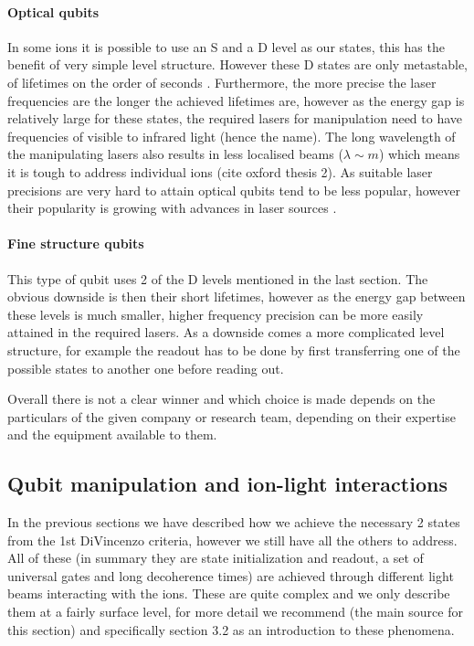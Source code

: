 \paragraph{Optical qubits}
In some ions it is possible to use an S and a D level as our states, this has the benefit of very simple level structure.
However these D states are only metastable, of lifetimes on the order of seconds \cite{ozeriTrappedionQubitTool2011}.
Furthermore, the more precise the laser frequencies are the longer the achieved lifetimes are, however as the energy gap is relatively large for these states, the required lasers for manipulation need to have frequencies of visible to infrared light (hence the name).
The long wavelength of the manipulating lasers also results in less localised beams ($\lambda \sim \si{m}$) which means it is tough to address individual ions (cite oxford thesis 2).
As suitable laser precisions are very hard to attain optical qubits tend to be less popular, however their popularity is growing with advances in laser sources \cite{bruzewiczTrappedionQuantumComputing2019}.

\paragraph{Fine structure qubits}
This type of qubit uses 2 of the D levels mentioned in the last section.
The obvious downside is then their short lifetimes, however as the energy gap between these levels is much smaller, higher frequency precision can be more easily attained in the required lasers.
As a downside comes a more complicated level structure, for example the readout has to be done by first transferring one of the possible states to another one before reading out.


Overall there is not a clear winner and which choice is made depends on the particulars of the given company or research team, depending on their expertise and the equipment available to them.


\subsection{Qubit manipulation and ion-light interactions}
In the previous sections we have described how we achieve the necessary 2 states from the 1st DiVincenzo criteria, however we still have all the others to address.
All of these (in summary they are state initialization and readout, a set of universal gates and long decoherence times) are achieved through different light beams interacting with the ions.
These are quite complex and we only describe them at a fairly surface level, for more detail we recommend \cite{schaferFastGatesMixedSpecies2020} (the main source for this section) and specifically section 3.2 as an introduction to these phenomena.

